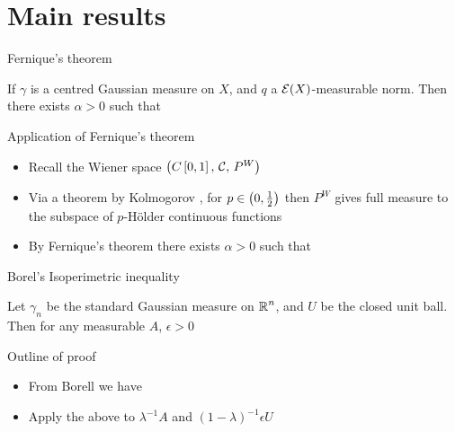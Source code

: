 \documentclass{beamer}
\begin{document}
\section{Main results}
\begin{frame}{Fernique's theorem}
    \begin{theorem}
    If $\gamma$ is a centred Gaussian measure on $X$, and $q$ a $\mathcal{E}(X)$-measurable norm. Then there exists $\alpha>0$ such that 
    \end{theorem}
\end{frame}
\begin{frame}{Application of Fernique's theorem}
    \begin{itemize}
        \item Recall the Wiener space $\del{C\intcc{0,1},\,\mathcal{C},\,P^W}$\pause
        \item Via a theorem by Kolmogorov \cite{Kallenberg2021}, for $p\in\intoo{0,\frac12}$ then $P^W$ gives full measure to the subspace of $p$-H\"older continuous functions\pause
        \item By Fernique's theorem there exists $\alpha>0$ such that 
    \end{itemize}
\end{frame}

\begin{frame}{Borel's Isoperimetric inequality}
    \begin{theorem}
    Let $\gamma_n$ be the standard Gaussian measure on $\operatorname{\mathbb{R}}^n$, and $U$ be the closed unit ball. Then for any measurable $A$, $\epsilon>0$ 
    \end{theorem}
\end{frame}
\begin{frame}{Outline of proof}
    \begin{itemize}
        \item From Borell \cite{Borell2003} we have  \pause
        \item Apply the above to $\lambda^{-1}A$ and $(1-\lambda)^{-1}\epsilon U$
    \end{itemize}
\end{frame}
\end{document}
